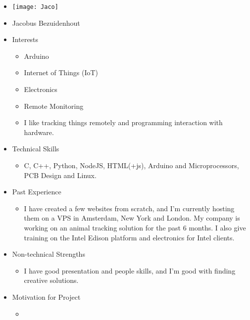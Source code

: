 
\begin{itemize}
	\item[] \texttt{[image: Jaco]}
	\item[] Jacobus Bezuidenhout
	\item Interests
	\begin{itemize}
		\item Arduino
		\item Internet of Things (IoT)
		\item Electronics
		\item Remote Monitoring
		\item I like tracking things remotely and programming interaction with hardware.
	\end{itemize}
	\item Technical Skills
	\begin{itemize}
		\item[] C, C++, Python, NodeJS, HTML(+js), Arduino and Microprocessors, PCB Design and Linux.
	\end{itemize}
	\item Past Experience
	\begin{itemize}
		\item[] I have created a few websites from scratch, and I'm currently hosting them on a VPS in Amsterdam, New York and London. My company is working on an animal tracking solution for the past 6 months. I also give training on the Intel Edison platform and electronics for Intel clients.
	\end{itemize}
	\item Non-technical Strengths
	\begin{itemize}
		\item[] I have good presentation and people skills, and I'm good with finding creative solutions.
	\end{itemize}
	\item Motivation for Project
	\begin{itemize}
		\item[] 
	\end{itemize}
\end{itemize}